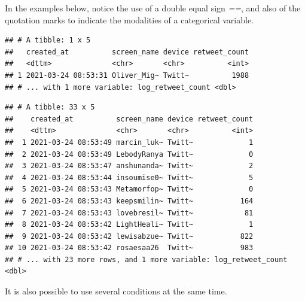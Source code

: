 \documentclass[
]{article}
\newenvironment{Shaded}{\begin{snugshade}}{\end{snugshade}}
\newcommand{\DecValTok}[1]{\textcolor[rgb]{0.00,0.00,0.81}{#1}}
\newcommand{\KeywordTok}[1]{\textcolor[rgb]{0.13,0.29,0.53}{\textbf{#1}}}
\newcommand{\NormalTok}[1]{#1}
\newcommand{\OperatorTok}[1]{\textcolor[rgb]{0.81,0.36,0.00}{\textbf{#1}}}
\newcommand{\StringTok}[1]{\textcolor[rgb]{0.31,0.60,0.02}{#1}}
\begin{document}
In the examples below, notice the use of a double equal sign \emph{==}, and also of the quotation marks to indicate the modalities of a categorical variable.

\begin{Shaded}
\end{Shaded}

\begin{verbatim}
## # A tibble: 1 x 5
##   created_at          screen_name device retweet_count
##   <dttm>              <chr>       <chr>          <int>
## 1 2021-03-24 08:53:31 Oliver_Mig~ Twitt~          1988
## # ... with 1 more variable: log_retweet_count <dbl>
\end{verbatim}

\begin{Shaded}
\end{Shaded}

\begin{verbatim}
## # A tibble: 33 x 5
##    created_at          screen_name device retweet_count
##    <dttm>              <chr>       <chr>          <int>
##  1 2021-03-24 08:53:49 marcin_luk~ Twitt~             1
##  2 2021-03-24 08:53:49 LebodyRanya Twitt~             0
##  3 2021-03-24 08:53:47 anshunanda~ Twitt~             2
##  4 2021-03-24 08:53:44 insoumise0~ Twitt~             5
##  5 2021-03-24 08:53:43 Metamorfop~ Twitt~             0
##  6 2021-03-24 08:53:43 keepsmilin~ Twitt~           164
##  7 2021-03-24 08:53:43 lovebresil~ Twitt~            81
##  8 2021-03-24 08:53:42 LightHeali~ Twitt~             1
##  9 2021-03-24 08:53:42 lewisabzue~ Twitt~           822
## 10 2021-03-24 08:53:42 rosaesaa26  Twitt~           983
## # ... with 23 more rows, and 1 more variable: log_retweet_count <dbl>
\end{verbatim}

It is also possible to use several conditions at the same time.

\begin{Shaded}
\end{Shaded}
\end{document}
